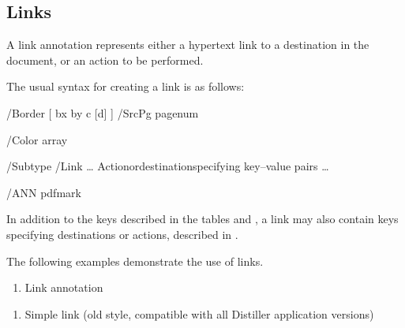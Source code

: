 \documentclass[letterpaper,12pt,english,openany,oneside]{sphinxmanual}
\begin{document}
\subsection{Links}
\label{\detokenize{pdfmark_Basic:links}}
A link annotation represents either a hypertext link to a destination in the document, or an action to be performed.

The usual syntax for creating a link is as follows:

\begin{sphinxVerbatim}[commandchars=\\\{\}]
[/Rect [
xll yll xur yur
]
/Border [
bx by c [d]
]
/SrcPg
pagenum

/Color
array

/Subtype /Link
… Action\PYGZhy{}or\PYGZhy{}destination\PYGZhy{}specifying key–value pairs …

/ANN pdfmark
\end{sphinxVerbatim}

In addition to the keys described in the tables  and , a link may also contain keys specifying destinations or actions, described in .

The following examples demonstrate the use of links.
\begin{enumerate}
%
\item {} 
Link annotation

\end{enumerate}

\begin{sphinxVerbatim}[commandchars=\\\{\}]
\PYG{p}{[}  \PYG{p}{[}   \PYG{p}{]}
        \PYG{p}{[}   \PYG{p}{[}\PYG{p}{]}\PYG{p}{]}
        \PYG{p}{[}  \PYG{p}{]}
        
        \PYG{p}{[}   \PYG{p}{]}
        
        
\end{sphinxVerbatim}
\begin{enumerate}
%
\item {} 
Simple link (old style, compatible with all Distiller application versions)

\end{enumerate}
\end{document}
